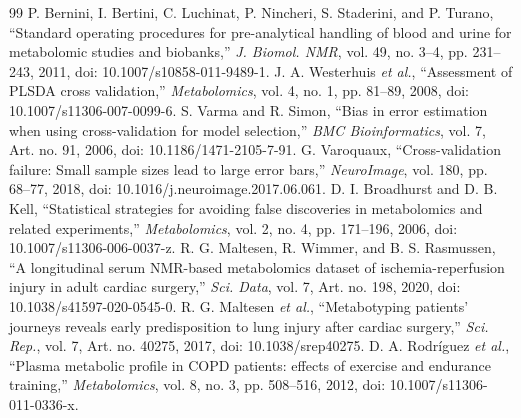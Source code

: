 \begin{thebibliography}{99}
 P. Bernini, I. Bertini, C. Luchinat, P. Nincheri, S. Staderini, and P. Turano, ``Standard operating procedures for pre-analytical handling of blood and urine for metabolomic studies and biobanks,'' \textit{J. Biomol. NMR}, vol. 49, no. 3--4, pp. 231--243, 2011, doi: 10.1007/s10858-011-9489-1.
 J. A. Westerhuis \textit{et al.}, ``Assessment of PLSDA cross validation,'' \textit{Metabolomics}, vol. 4, no. 1, pp. 81--89, 2008, doi: 10.1007/s11306-007-0099-6.
 S. Varma and R. Simon, ``Bias in error estimation when using cross-validation for model selection,'' \textit{BMC Bioinformatics}, vol. 7, Art. no. 91, 2006, doi: 10.1186/1471-2105-7-91.
 G. Varoquaux, ``Cross-validation failure: Small sample sizes lead to large error bars,'' \textit{NeuroImage}, vol. 180, pp. 68--77, 2018, doi: 10.1016/j.neuroimage.2017.06.061.
 D. I. Broadhurst and D. B. Kell, ``Statistical strategies for avoiding false discoveries in metabolomics and related experiments,'' \textit{Metabolomics}, vol. 2, no. 4, pp. 171--196, 2006, doi: 10.1007/s11306-006-0037-z.
 R. G. Maltesen, R. Wimmer, and B. S. Rasmussen, ``A longitudinal serum NMR-based metabolomics dataset of ischemia-reperfusion injury in adult cardiac surgery,'' \textit{Sci. Data}, vol. 7, Art. no. 198, 2020, doi: 10.1038/s41597-020-0545-0.
 R. G. Maltesen \textit{et al.}, ``Metabotyping patients' journeys reveals early predisposition to lung injury after cardiac surgery,'' \textit{Sci. Rep.}, vol. 7, Art. no. 40275, 2017, doi: 10.1038/srep40275.
 D. A. Rodr\'iguez \textit{et al.}, ``Plasma metabolic profile in COPD patients: effects of exercise and endurance training,'' \textit{Metabolomics}, vol. 8, no. 3, pp. 508--516, 2012, doi: 10.1007/s11306-011-0336-x.

\end{thebibliography}
